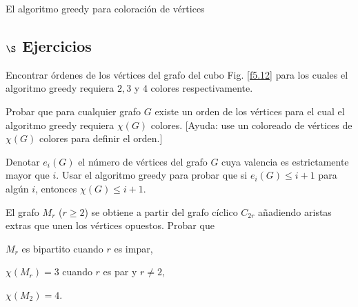 \begin{section}{El algoritmo greedy para coloración de vértices}
\subsection*{$\S$ Ejercicios}\label{ejercicio5.7} 
\begin{enumex}
\item Encontrar órdenes de los vértices del grafo del cubo Fig. \ref{f5.12}  para los cuales el algoritmo greedy requiera $2, 3$ y $4$ colores respectivamente.
\item \label{ejercicio5.7.2} Probar que para cualquier grafo $G$ existe un orden de los vértices para el cual el algoritmo greedy requiera $\chi(G)$ colores. [Ayuda: use un coloreado de vértices de $\chi(G)$ colores para definir el orden.]
\item Denotar $e_i(G)$ el número de vértices del grafo $G$ cuya valencia es estrictamente mayor que $i$. Usar el algoritmo greedy para probar que si $e_i(G) \le i+1$ para algún $i$, entonces $\chi(G) \le
i+1$.
\item El grafo $M_r$ ($r\ge 2$) se obtiene a partir del grafo cíclico $C_{2r}$ añadiendo aristas extras que unen los vértices opuestos. Probar que 
\begin{enumex}
    \item $M_r$ es bipartito cuando $r$ es impar,
    
    \item $\chi(M_r)=3$ cuando $r$ es par y $r\not= 2$,
    
    \item $\chi(M_2)=4$.
\end{enumex}
\end{enumex}
\end{section}
